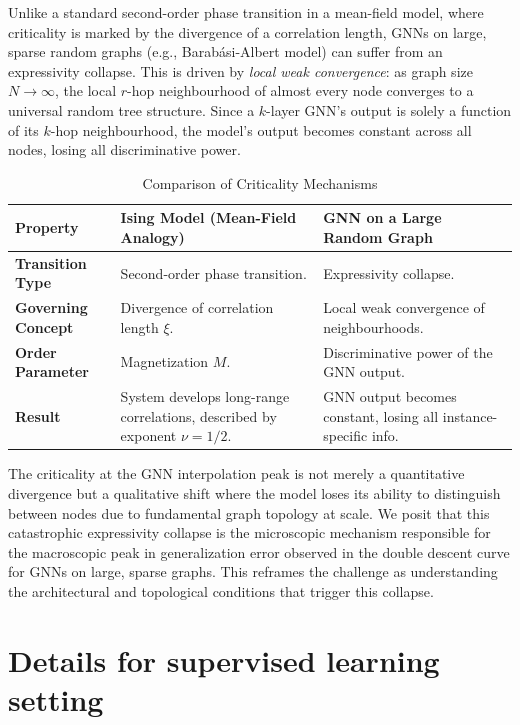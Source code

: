 \documentclass[10pt,oneside,oldfontcommands,dvipsnames,article]{memoir}
\begin{document}
Unlike a standard second-order phase transition in a mean-field model, where criticality is marked by the divergence of a correlation length, GNNs on large, sparse random graphs (e.g., Barabási-Albert model) can suffer from an expressivity collapse. This is driven by \textit{local weak convergence}: as graph size $N \to \infty$, the local $r$-hop neighbourhood of almost every node converges to a universal random tree structure. Since a $k$-layer GNN's output is solely a function of its $k$-hop neighbourhood, the model's output becomes constant across all nodes, losing all discriminative power.

\begin{table}[h!]
\centering
\small
\caption{Comparison of Criticality Mechanisms}
\begin{tabular}{|p{3cm}|p{5cm}|p{5cm}|}
\hline
\textbf{Property} & \textbf{Ising Model (Mean-Field Analogy)} & \textbf{GNN on a Large Random Graph} \\
\hline
\textbf{Transition Type} & Second-order phase transition. & Expressivity collapse. \\
\hline
\textbf{Governing Concept} & Divergence of correlation length $\xi$. & Local weak convergence of neighbourhoods. \\
\hline
\textbf{Order Parameter} & Magnetization $M$. & Discriminative power of the GNN output. \\
\hline
\textbf{Result} & System develops long-range correlations, described by exponent $\nu=1/2$. & GNN output becomes constant, losing all instance-specific info. \\
\hline
\end{tabular}
\end{table}
The criticality at the GNN interpolation peak is not merely a quantitative divergence but a qualitative shift where the model loses its ability to distinguish between nodes due to fundamental graph topology at scale. We posit that this catastrophic expressivity collapse is the microscopic mechanism responsible for the macroscopic peak in generalization error observed in the double descent curve for GNNs on large, sparse graphs. This reframes the challenge as understanding the architectural and topological conditions that trigger this collapse.

\clearpage

\appendix

\section*{Details for supervised learning setting}
\end{document}
